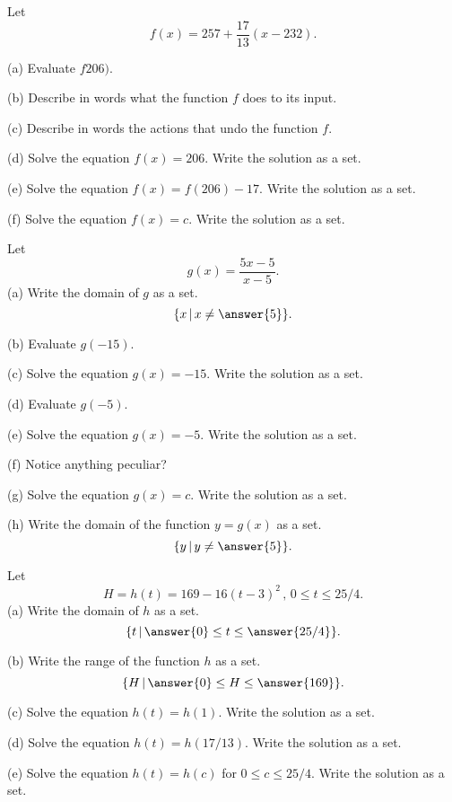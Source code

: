 \documentclass{ximera}
\begin{document}
\begin{question} \label{Q38742433}
Let 
\[
     f(x) = 257 + \frac{17}{13}(x-232).
\]

(a) Evaluate $f206)$.

(b) Describe in words what the function $f$ does to its input.

(c) Describe in words the actions that undo the function $f$.

(d) Solve the equation $f(x) = 206$. Write the solution as a set.

(e) Solve the equation $f(x)=f(206) - 17$. Write the solution as a set.

(f) Solve the equation $f(x)=c$. Write the solution as a set.

\end{question}


\begin{question}  \label{Qdfr4545r443243}
Let
\[
        g(x) = \frac{5x-5}{x-5} . 
\]
(a) Write the domain of $g$ as a set.
\[
  \{ x \, | \, x \neq \answer{5} \}.
\]

(b) Evaluate $g(-15)$.

(c) Solve the equation $g(x)=-15$. Write the solution as a set.

(d) Evaluate $g(-5)$.

(e) Solve the equation $g(x)=-5$. Write the solution as a set.

(f) Notice anything peculiar?

(g) Solve the equation $g(x)=c$. Write the solution as a set.

(h) Write the domain of the function $y=g(x)$ as a set.
\[
     \{ y \, | \, y \neq \answer{5} \}.
\]
\end{question}

\begin{question}  \label{Q9830449}
Let
\[
      H= h(t) = 169 - 16(t-3)^2 \, , \, 0\leq t \leq 25/4 .
\]
(a) Write the domain of $h$ as a set.
\[
  \{ t \, | \, \answer{0} \leq t \leq \answer{25/4} \}.
\]

(b) Write the range of the function $h$ as a set.
\[
    \{ H \, | \, \answer{0} \leq H \leq \answer{169} \}.
\]

(c) Solve the equation $h(t) = h(1)$. Write the solution as a set.

(d) Solve the equation $h(t) = h(17/13)$. Write the solution as a set.

(e) Solve the equation $h(t) = h(c)$ for $0\leq c \leq 25/4$. Write the solution as a set.

\end{question}
\end{document}
